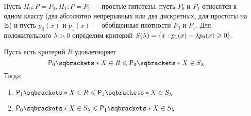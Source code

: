 Пусть \(H_0: P = P_0, H_1: P = P_1\) --- простые гипотезы, пусть \(P_0\) и \(P_1\) относятся к одном классу (два абсолютно непрерывных или два дискретных, для простоты на \(\mathbb{Z}\)) и пусть \(p_0(x)\) и \(p_1(x)\) --- обобщенные плотности \(P_0\) и \(P_1\). Для положительного \(\lambda > 0\) определим критерий \(S(\lambda) = \left\{x : p_1(x) - \lambda p_0(x) \geqslant 0\right\}\).
\begin{lemma}
    Пусть есть критерий \(R\) удовлетворяет
    \begin{displaymath}
        \PP[0]{X \in R} \leq \PP[0]{X \in S_\lambda}
    \end{displaymath}
    Тогда:
    \begin{enumerate}
        \item \(\PP[1]{X \in R} \leq \PP[1]{X \in S_\lambda}\)
        \item \(\PP[0]{X \in S_\lambda} \leq \PP[1]{X \in S_\lambda}\)
    \end{enumerate}
\end{lemma}
